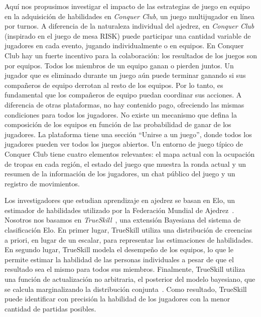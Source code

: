 \documentclass[a4paper,11pt]{book}
\theoremstyle{definition}
\begin{document}
Aqu\'i nos propusimos investigar el impacto de las estrategias de juego en equipo en la adquisici\'on de habilidades en \emph{Conquer Club}, un juego multijugador en l\'inea por turnos.
%
A diferencia de la naturaleza individual del ajedrez, en \emph{Conquer Club} (inspirado en el juego de mesa RISK) puede participar una cantidad variable de jugadores en cada evento, jugando individualmente o en equipos.
%
En Conquer Club hay un fuerte incentivo para la colaboraci\'on: los resultados de los juegos son por equipos.
%
Todos los miembros de un equipo ganan o pierden juntos.
%
Un jugador que es eliminado durante un juego a\'un puede terminar ganando si sus compa\~neros de equipo derrotan al resto de los equipos.
%
Por lo tanto, es fundamental que los compa\~neros de equipo puedan coordinar sus acciones.
%
A diferencia de otras plataformas, no hay contenido pago, ofreciendo las mismas condiciones para todos los jugadores.
%
No existe un mecanismo que defina la composici\'on de los equipos en funci\'on de las probabilidad de ganar de los jugadores.
%
La plataforma tiene una secci\'on ``Unirse a un juego'', donde todos los jugadores pueden ver todos los juegos abiertos.
%
Un entorno de juego t\'ipico de Conquer Club tiene cuatro elementos relevantes: el mapa actual con la ocupaci\'on de tropas en cada regi\'on, el estado del juego que muestra la ronda actual y un resumen de la informaci\'on de los jugadores, un chat p\'ublico del juego y un registro de movimientos.


Los investigadores que estudian aprendizaje en ajedrez se basan en Elo, un estimador de habilidades utilizado por la Federaci\'on Mundial de Ajedrez~\cite{glickman1995-guideToChessRatings,glickman2001}.
%
Nosotros nos basamos en \emph{TrueSkill}~\cite{Herbrich2007}, una extensi\'on Bayesiana del sistema de clasificaci\'on Elo.
%
En primer lugar, TrueSkill utiliza una distribuci\'on de creencias a priori, en lugar de un escalar, para representar las estimaciones de habilidades.
%
En segundo lugar, TrueSkill modela el desempe\~no de los equipos, lo que le permite estimar la habilidad de las personas individuales a pesar de que el resultado sea el mismo para todos sus miembros.
%
Finalmente, TrueSkill utiliza una funci\'on de actualizaci\'on no arbitraria, el posterior del modelo bayesiano, que se calcula marginalizando la distribuci\'on conjunta~\cite{Kschischang2001}.
%
Como resultado, TrueSkill puede identificar con precisi\'on la habilidad de los jugadores con la menor cantidad de partidas posibles.
\end{document}
